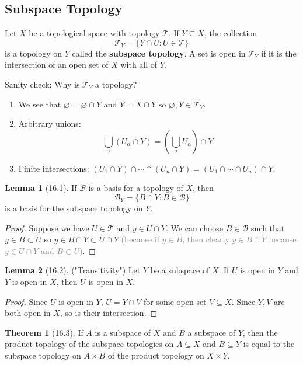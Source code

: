 \documentclass{article}
\newcommand{\com}[1]{\textcolor{grey}{#1}}
\theoremstyle{definition}
\newtheorem{theorem}{Theorem}[subsection]
\newtheorem{lemma}{Lemma}[subsection]
\begin{document}
\begin{flushleft}
\subsection{Subspace Topology}

Let $X$ be  a topological space with topology $\mathcal{T}$. If $Y \subseteq X$, the collection
\[
\mathcal{T}_Y = \{ Y \cap U : U \in \mathcal{T} \}
\]
is a topology on $Y$ called the \textbf{subspace topology}. A set is open in $\mathcal{T}_Y$ if it is the intersection of an open set of $X$ with all of $Y$.

Sanity check: Why is $\mathcal{T}_Y$ a topology?

\begin{enumerate}
    \item We see that $\varnothing = \varnothing \cap Y$ and $Y = X \cap Y$ so $\varnothing, Y \in \mathcal{T}_Y$.
    \item Arbitrary unions:
    \[
    \bigcup_{\alpha} (U_\alpha \cap Y) = (\bigcup_{\alpha} U_\alpha) \cap Y.
    \]
    \item Finite intersections: $(U_1 \cap Y) \cap \cdots \cap (U_n \cap Y) = (U_1 \cap \cdots \cap U_n) \cap Y$.
\end{enumerate}

\begin{lemma}[16.1]
If $\mathcal{B}$ is a basis for a topology of $X$, then
\[
\mathcal{B}_Y = \{ B \cap Y : B \in \mathcal{B} \}
\]
is a basis for the subspace topology on $Y$.
\end{lemma}

\begin{proof}
Suppose we have $U \in \mathcal{T}$ and $y \in U \cap Y$. We can choose $B \in \mathcal{B}$ such that $y \in B \subset U$ so $y \in B \cap Y \subset U \cap Y$ \com{(because if $y \in B$, then clearly $y \in B \cap Y$ because $y \in U \cap Y$ and $B \subset U$)}.
\end{proof}

\begin{lemma}[16.2]
("Transitivity") Let $Y$ be a subspace of $X$. If $U$ is open in $Y$ and $Y$ is open in $X$, then $U$ is open in $X$.
\end{lemma}

\begin{proof}
Since $U$ is open in $Y$, $U = Y \cap V$ for some open set $V \subseteq X$. Since $Y, V$ are both open in $X$, so is their intersection.
\end{proof}

\begin{theorem}[16.3]
If $A$ is a subspace of $X$ and $B$ a subspace of $Y$, then the product topology of the subspace topologies on $A \subseteq X$ and $B \subseteq Y$ is equal to the subspace topology on $A \times B$ of the product topology on $X \times Y$.
\end{theorem}


\end{flushleft}
\end{document}
